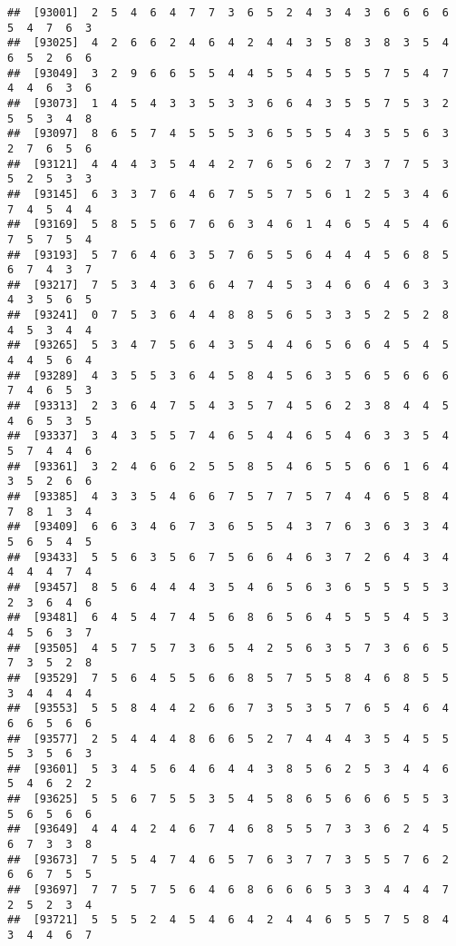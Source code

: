 \documentclass[
]{book}
\begin{document}
\begin{verbatim}
##  [93001]  2  5  4  6  4  7  7  3  6  5  2  4  3  4  3  6  6  6  6  5  4  7  6  3
##  [93025]  4  2  6  6  2  4  6  4  2  4  4  3  5  8  3  8  3  5  4  6  5  2  6  6
##  [93049]  3  2  9  6  6  5  5  4  4  5  5  4  5  5  5  7  5  4  7  4  4  6  3  6
##  [93073]  1  4  5  4  3  3  5  3  3  6  6  4  3  5  5  7  5  3  2  5  5  3  4  8
##  [93097]  8  6  5  7  4  5  5  5  3  6  5  5  5  4  3  5  5  6  3  2  7  6  5  6
##  [93121]  4  4  4  3  5  4  4  2  7  6  5  6  2  7  3  7  7  5  3  5  2  5  3  3
##  [93145]  6  3  3  7  6  4  6  7  5  5  7  5  6  1  2  5  3  4  6  7  4  5  4  4
##  [93169]  5  8  5  5  6  7  6  6  3  4  6  1  4  6  5  4  5  4  6  7  5  7  5  4
##  [93193]  5  7  6  4  6  3  5  7  6  5  5  6  4  4  4  5  6  8  5  6  7  4  3  7
##  [93217]  7  5  3  4  3  6  6  4  7  4  5  3  4  6  6  4  6  3  3  4  3  5  6  5
##  [93241]  0  7  5  3  6  4  4  8  8  5  6  5  3  3  5  2  5  2  8  4  5  3  4  4
##  [93265]  5  3  4  7  5  6  4  3  5  4  4  6  5  6  6  4  5  4  5  4  4  5  6  4
##  [93289]  4  3  5  5  3  6  4  5  8  4  5  6  3  5  6  5  6  6  6  7  4  6  5  3
##  [93313]  2  3  6  4  7  5  4  3  5  7  4  5  6  2  3  8  4  4  5  4  6  5  3  5
##  [93337]  3  4  3  5  5  7  4  6  5  4  4  6  5  4  6  3  3  5  4  5  7  4  4  6
##  [93361]  3  2  4  6  6  2  5  5  8  5  4  6  5  5  6  6  1  6  4  3  5  2  6  6
##  [93385]  4  3  3  5  4  6  6  7  5  7  7  5  7  4  4  6  5  8  4  7  8  1  3  4
##  [93409]  6  6  3  4  6  7  3  6  5  5  4  3  7  6  3  6  3  3  4  5  6  5  4  5
##  [93433]  5  5  6  3  5  6  7  5  6  6  4  6  3  7  2  6  4  3  4  4  4  4  7  4
##  [93457]  8  5  6  4  4  4  3  5  4  6  5  6  3  6  5  5  5  5  3  2  3  6  4  6
##  [93481]  6  4  5  4  7  4  5  6  8  6  5  6  4  5  5  5  4  5  3  4  5  6  3  7
##  [93505]  4  5  7  5  7  3  6  5  4  2  5  6  3  5  7  3  6  6  5  7  3  5  2  8
##  [93529]  7  5  6  4  5  5  6  6  8  5  7  5  5  8  4  6  8  5  5  3  4  4  4  4
##  [93553]  5  5  8  4  4  2  6  6  7  3  5  3  5  7  6  5  4  6  4  6  6  5  6  6
##  [93577]  2  5  4  4  4  8  6  6  5  2  7  4  4  4  3  5  4  5  5  5  3  5  6  3
##  [93601]  5  3  4  5  6  4  6  4  4  3  8  5  6  2  5  3  4  4  6  5  4  6  2  2
##  [93625]  5  5  6  7  5  5  3  5  4  5  8  6  5  6  6  6  5  5  3  5  6  5  6  6
##  [93649]  4  4  4  2  4  6  7  4  6  8  5  5  7  3  3  6  2  4  5  6  7  3  3  8
##  [93673]  7  5  5  4  7  4  6  5  7  6  3  7  7  3  5  5  7  6  2  6  6  7  5  5
##  [93697]  7  7  5  7  5  6  4  6  8  6  6  6  5  3  3  4  4  4  7  2  5  2  3  4
##  [93721]  5  5  5  2  4  5  4  6  4  2  4  4  6  5  5  7  5  8  4  3  4  4  6  7

\end{verbatim}
\end{document}
